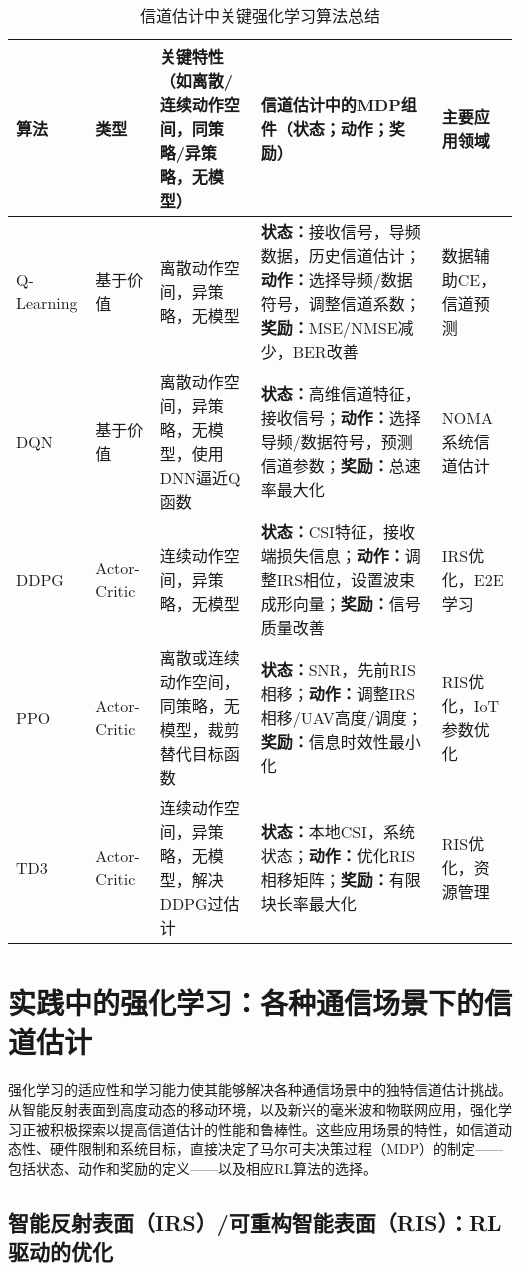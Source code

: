 \documentclass[journal]{IEEEtran}
\begin{document}
\begin{table*}[!t]
\caption{信道估计中关键强化学习算法总结}
\label{tab:table1}
\centering
\begin{tabular}{|p{1.8cm}|p{1.5cm}|p{4.5cm}|p{4.5cm}|p{3cm}|}
\hline
\textbf{算法} & \textbf{类型} & \textbf{关键特性}（如离散/连续动作空间，同策略/异策略，无模型） & \textbf{信道估计中的MDP组件}（状态；动作；奖励） & \textbf{主要应用领域} \\
\hline
Q-Learning & 基于价值 & 离散动作空间，异策略，无模型 & \textbf{状态：}接收信号，导频数据，历史信道估计；\textbf{动作：}选择导频/数据符号，调整信道系数；\textbf{奖励：}MSE/NMSE减少，BER改善 & 数据辅助CE，信道预测 \\
\hline
DQN & 基于价值 & 离散动作空间，异策略，无模型，使用DNN逼近Q函数 & \textbf{状态：}高维信道特征，接收信号；\textbf{动作：}选择导频/数据符号，预测信道参数；\textbf{奖励：}总速率最大化 & NOMA系统信道估计 \\
\hline
DDPG & Actor-Critic & 连续动作空间，异策略，无模型 & \textbf{状态：}CSI特征，接收端损失信息；\textbf{动作：}调整IRS相位，设置波束成形向量；\textbf{奖励：}信号质量改善 & IRS优化，E2E学习 \\
\hline
PPO & Actor-Critic & 离散或连续动作空间，同策略，无模型，裁剪替代目标函数 & \textbf{状态：}SNR，先前RIS相移；\textbf{动作：}调整IRS相移/UAV高度/调度；\textbf{奖励：}信息时效性最小化 & RIS优化，IoT参数优化 \\
\hline
TD3 & Actor-Critic & 连续动作空间，异策略，无模型，解决DDPG过估计 & \textbf{状态：}本地CSI，系统状态；\textbf{动作：}优化RIS相移矩阵；\textbf{奖励：}有限块长率最大化 & RIS优化，资源管理 \\
\hline
\end{tabular}
\end{table*}

\section{实践中的强化学习：各种通信场景下的信道估计}

强化学习的适应性和学习能力使其能够解决各种通信场景中的独特信道估计挑战。从智能反射表面到高度动态的移动环境，以及新兴的毫米波和物联网应用，强化学习正被积极探索以提高信道估计的性能和鲁棒性。这些应用场景的特性，如信道动态性、硬件限制和系统目标，直接决定了马尔可夫决策过程（MDP）的制定——包括状态、动作和奖励的定义——以及相应RL算法的选择。

\subsection{智能反射表面（IRS）/可重构智能表面（RIS）：RL驱动的优化}
\end{document}
